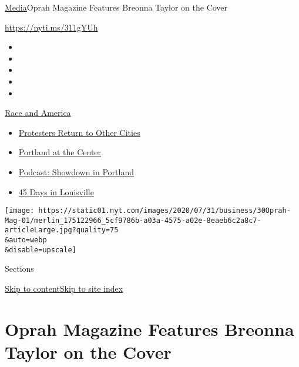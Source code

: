 \href{/section/business/media}{Media}\textbar{}Oprah Magazine Features
Breonna Taylor on the Cover

\url{https://nyti.ms/311gYUh}

\begin{itemize}
\item
\item
\item
\item
\item
\end{itemize}

\href{https://www.nytimes.com/news-event/george-floyd-protests-minneapolis-new-york-los-angeles?action=click\&pgtype=Article\&state=default\&region=TOP_BANNER\&context=storylines_menu}{Race
and America}

\begin{itemize}
\tightlist
\item
  \href{https://www.nytimes.com/2020/07/26/us/protests-portland-seattle-trump.html?action=click\&pgtype=Article\&state=default\&region=TOP_BANNER\&context=storylines_menu}{Protesters
  Return to Other Cities}
\item
  \href{https://www.nytimes.com/2020/07/24/us/portland-oregon-protests-white-race.html?action=click\&pgtype=Article\&state=default\&region=TOP_BANNER\&context=storylines_menu}{Portland
  at the Center}
\item
  \href{https://www.nytimes.com/2020/07/23/podcasts/the-daily/portland-protests.html?action=click\&pgtype=Article\&state=default\&region=TOP_BANNER\&context=storylines_menu}{Podcast:
  Showdown in Portland}
\item
  \href{https://www.nytimes.com/interactive/2020/07/16/us/black-lives-matter-protests-louisville-breonna-taylor.html?action=click\&pgtype=Article\&state=default\&region=TOP_BANNER\&context=storylines_menu}{45
  Days in Louisville}
\end{itemize}

\texttt{[image: https://static01.nyt.com/images/2020/07/31/business/30Oprah-Mag-01/merlin\_175122966\_5cf9786b-a03a-4575-a02e-8eaeb6c2a8c7-articleLarge.jpg?quality=75\\\&auto=webp\\\&disable=upscale]}

Sections

\protect\hyperlink{site-content}{Skip to
content}\protect\hyperlink{site-index}{Skip to site index}

\hypertarget{oprah-magazine-features-breonna-taylor-on-the-cover}{%
\section{Oprah Magazine Features Breonna Taylor on the
Cover}\label{oprah-magazine-features-breonna-taylor-on-the-cover}}

